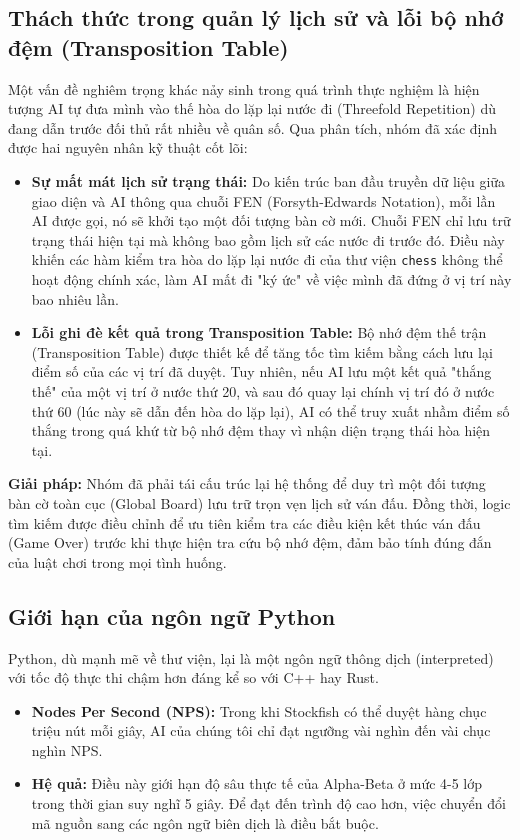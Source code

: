 \subsection{Thách thức trong quản lý lịch sử và lỗi bộ nhớ đệm (Transposition Table)}
Một vấn đề nghiêm trọng khác nảy sinh trong quá trình thực nghiệm là hiện tượng AI tự đưa mình vào thế hòa do lặp lại nước đi (Threefold Repetition) dù đang dẫn trước đối thủ rất nhiều về quân số. Qua phân tích, nhóm đã xác định được hai nguyên nhân kỹ thuật cốt lõi:

\begin{itemize}
    \item \textbf{Sự mất mát lịch sử trạng thái:} Do kiến trúc ban đầu truyền dữ liệu giữa giao diện và AI thông qua chuỗi FEN (Forsyth-Edwards Notation), mỗi lần AI được gọi, nó sẽ khởi tạo một đối tượng bàn cờ mới. Chuỗi FEN chỉ lưu trữ trạng thái hiện tại mà không bao gồm lịch sử các nước đi trước đó. Điều này khiến các hàm kiểm tra hòa do lặp lại nước đi của thư viện \texttt{chess} không thể hoạt động chính xác, làm AI mất đi "ký ức" về việc mình đã đứng ở vị trí này bao nhiêu lần.
    \item \textbf{Lỗi ghi đè kết quả trong Transposition Table:} Bộ nhớ đệm thế trận (Transposition Table) được thiết kế để tăng tốc tìm kiếm bằng cách lưu lại điểm số của các vị trí đã duyệt. Tuy nhiên, nếu AI lưu một kết quả "thắng thế" của một vị trí ở nước thứ 20, và sau đó quay lại chính vị trí đó ở nước thứ 60 (lúc này sẽ dẫn đến hòa do lặp lại), AI có thể truy xuất nhầm điểm số thắng trong quá khứ từ bộ nhớ đệm thay vì nhận diện trạng thái hòa hiện tại.
\end{itemize}

\textbf{Giải pháp:} Nhóm đã phải tái cấu trúc lại hệ thống để duy trì một đối tượng bàn cờ toàn cục (Global Board) lưu trữ trọn vẹn lịch sử ván đấu. Đồng thời, logic tìm kiếm được điều chỉnh để ưu tiên kiểm tra các điều kiện kết thúc ván đấu (Game Over) trước khi thực hiện tra cứu bộ nhớ đệm, đảm bảo tính đúng đắn của luật chơi trong mọi tình huống.

\subsection{Giới hạn của ngôn ngữ Python}
Python, dù mạnh mẽ về thư viện, lại là một ngôn ngữ thông dịch (interpreted) với tốc độ thực thi chậm hơn đáng kể so với C++ hay Rust. 
\begin{itemize}
    \item \textbf{Nodes Per Second (NPS):} Trong khi Stockfish có thể duyệt hàng chục triệu nút mỗi giây, AI của chúng tôi chỉ đạt ngưỡng vài nghìn đến vài chục nghìn NPS. 
    \item \textbf{Hệ quả:} Điều này giới hạn độ sâu thực tế của Alpha-Beta ở mức 4-5 lớp trong thời gian suy nghĩ 5 giây. Để đạt đến trình độ cao hơn, việc chuyển đổi mã nguồn sang các ngôn ngữ biên dịch là điều bắt buộc.
\end{itemize}
